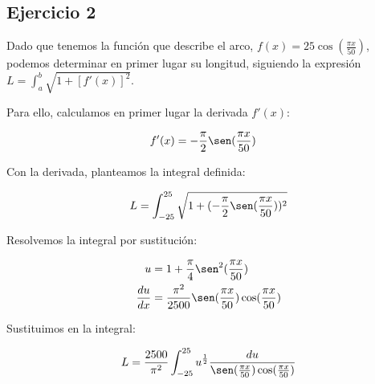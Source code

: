 \subsection*{Ejercicio 2}

Dado que tenemos la función que describe el arco,
\(f(x) = 25 \cos (\frac{\pi x}{50})\),
podemos determinar en primer lugar su longitud,
siguiendo la expresión \(L=\int_{a}^{b}\sqrt{1+[f'(x)]^2}\).

Para ello, calculamos en primer lugar la derivada \(f'(x)\):

\begin{align*}
    f'(x) & = -\frac{\pi}{2} \sen(\frac{\pi x}{50})
\end{align*}

Con la derivada, planteamos la integral definida:

\begin{align*}
    L & = \int_{-25}^{25}\sqrt{1+(-\frac{\pi}{2} \sen(\frac{\pi x}{50}))^2} \\
\end{align*}

Resolvemos la integral por sustitución:

\begin{align*}
    u & = 1+\frac{\pi}{4} \sen^2(\frac{\pi x}{50}) \\
    \frac{du}{dx} & = \frac{\pi^2}{2500}\sen(\frac{\pi x}{50})\cos(\frac{\pi x}{50}) \\
\end{align*}

Sustituimos en la integral:

\begin{align*}
    L & = \frac{2500}{\pi^{2}}\int_{-25}^{25}u^{\frac{1}{2}} \frac{du}{\sen(\frac{\pi x}{50})\cos(\frac{\pi x}{50})} \\
\end{align*}